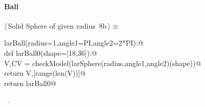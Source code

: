 \documentclass[11pt,oneside]{article}	%
\begin{document}
\paragraph{Ball}
\begin{flushleft} \small \label{scrap14}
\protect{}$\langle\,$Solid Sphere of given radius\nobreak\ {\footnotesize 8b}$\,\rangle\equiv$
\vspace{-1ex}
\begin{list}{}{} \item
\mbox{}\verb@def larBall(radius=1,angle1=PI,angle2=2*PI):@\\
\mbox{}\verb@   def larBall0(shape=[18,36]):@\\
\mbox{}\verb@      V,CV = checkModel(larSphere(radius,angle1,angle2)(shape))@\\
\mbox{}\verb@      return V,[range(len(V))]@\\
\mbox{}\verb@   return larBall0@\\
\mbox{}\verb@@{\NWsep}
\end{list}
\vspace{-1ex}
\footnotesize\addtolength{\baselineskip}{-1ex}
\begin{list}{}{\setlength{\itemsep}{-\parsep}\setlength{\itemindent}{-\leftmargin}}
\item \NWtxtMacroRefIn\ .
\end{list}
\end{flushleft}
\end{document}
